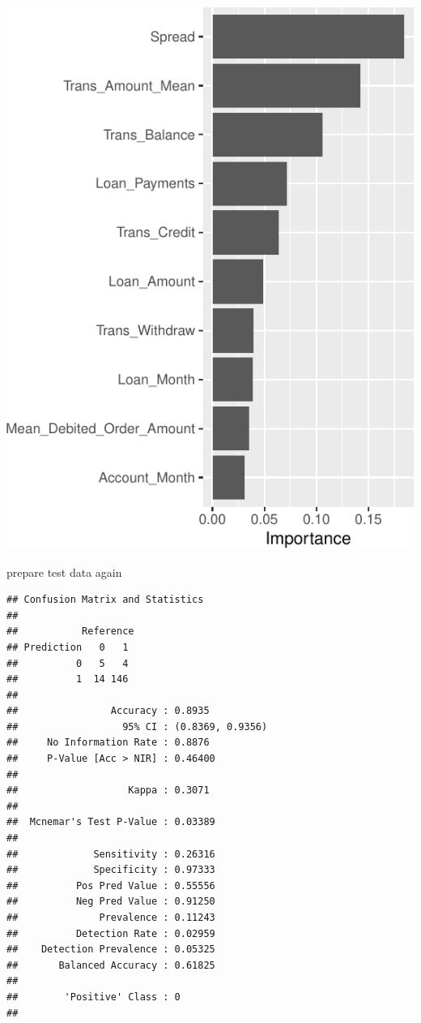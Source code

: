 \documentclass[11pt,preprint, authoryear]{elsarticle}
\let\origfigure\figure
\let\endorigfigure\endfigure
\renewenvironment{figure}[1][2] {
    \expandafter\origfigure\expandafter[H]
} {
    \endorigfigure
}
\numberwithin{equation}{section}
\numberwithin{figure}{section}
\numberwithin{table}{section}
\begin{document}
\begin{figure}[H]

{\centering \includegraphics{DS-Report-20065124_files/figure-latex/unnamed-chunk-35-1} 

}

\caption{Variable Importance \label{FigureVIP}}\label{fig:unnamed-chunk-35}
\end{figure}

prepare test data again

\begin{verbatim}
## Confusion Matrix and Statistics
## 
##           Reference
## Prediction   0   1
##          0   5   4
##          1  14 146
##                                           
##                Accuracy : 0.8935          
##                  95% CI : (0.8369, 0.9356)
##     No Information Rate : 0.8876          
##     P-Value [Acc > NIR] : 0.46400         
##                                           
##                   Kappa : 0.3071          
##                                           
##  Mcnemar's Test P-Value : 0.03389         
##                                           
##             Sensitivity : 0.26316         
##             Specificity : 0.97333         
##          Pos Pred Value : 0.55556         
##          Neg Pred Value : 0.91250         
##              Prevalence : 0.11243         
##          Detection Rate : 0.02959         
##    Detection Prevalence : 0.05325         
##       Balanced Accuracy : 0.61825         
##                                           
##        'Positive' Class : 0               
## 
\end{verbatim}
\end{document}
